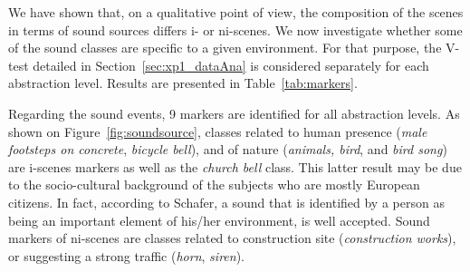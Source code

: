\documentclass[12pt]{elsarticle}
\newcommand{\cf}{cf.}
\begin{document}

We have shown that, on a qualitative point of view, the composition of the scenes in terms of sound sources differs i- or ni-scenes. We now investigate whether some of the sound classes are specific to a given environment. For that purpose, the V-test detailed in  Section~\ref{sec:xp1_dataAna} is considered separately for each abstraction level. Results are presented in Table~\ref{tab:markers}.


Regarding the sound events, 9 markers are identified for all abstraction levels. As shown on Figure~\ref{fig:soundsource}, classes related to human presence (\emph{male footsteps on concrete}, \emph{bicycle bell}), and of nature (\emph{animals, bird}, and \emph{bird song}) are i-scenes markers as well as the \emph{church bell} class. This latter result may be due to the socio-cultural background of the subjects who are mostly European citizens. In fact, according to Schafer, a sound that is identified by a person as being an important element of his/her environment, is well accepted. Sound markers of ni-scenes are classes related to construction site (\emph{construction works}), or suggesting a strong traffic (\emph{horn}, \emph{siren}).
\end{document}
